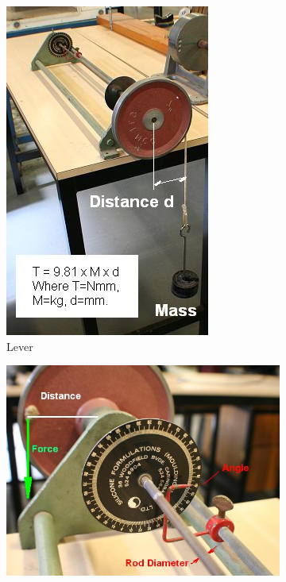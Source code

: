 \documentclass[12pt,a4paper]{article}	%
\begin{document}
\begin{figure}[h!]
	\centering
\begin{subfigure}[b]{4.2cm}
	\includegraphics[width=\linewidth]{Problem Statement Setup2.jpg}
	\caption{Lever}
\end{subfigure} \hspace{10mm}%
\begin{subfigure}[b]{8.5cm}
	\includegraphics[width=\linewidth]{Problem Statement Setup3.jpg}

\end{subfigure}
\end{figure}
\end{document}
